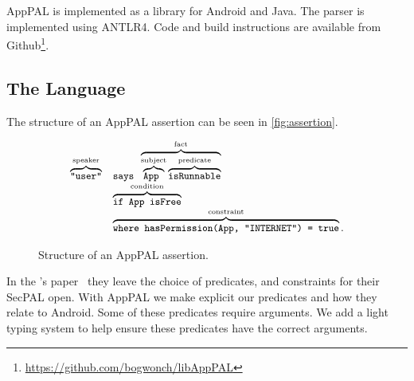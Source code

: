\documentclass[]{scrartcl}
\begin{document}
AppPAL is implemented as a library for Android and Java.
The parser is implemented using ANTLR4.
Code and build instructions are available from Github\footnote{\url{https://github.com/bogwonch/libAppPAL}}.

\subsection{The Language}
\label{ssec:language}

The structure of an AppPAL assertion can be seen in \autoref{fig:assertion}.

\begin{figure}
  \centering
  \begin{equation*}\small
    \begin{array}{r l}
      \overbrace{\text{\ttfamily "user"}}^{\text{speaker}} &
      \text{\ttfamily says }\overbrace{\overbrace{\text{\ttfamily App }}^{\text{subject}}\overbrace{\text{\ttfamily isRunnable}}^{\text{predicate}}}^{\text{fact}} \\
      & \overbrace{\text{\ttfamily if App isFree}}^{\text{condition}} \\
      & \overbrace{\text{\ttfamily where hasPermission(App, "INTERNET") = true}}^{\text{constraint}}.
    \end{array}
  \end{equation*}
  \caption{Structure of an AppPAL assertion.}
\label{fig:assertion}
\end{figure}

In the \citeauthor{Becker:2006vh}'s paper~\citep{Becker:2006vh} they leave the choice of predicates, and constraints for their SecPAL open.
With AppPAL we make explicit our predicates and how they relate to Android.
Some of these predicates require arguments.
We add a light typing system to help ensure these predicates have the correct arguments.
\end{document}
